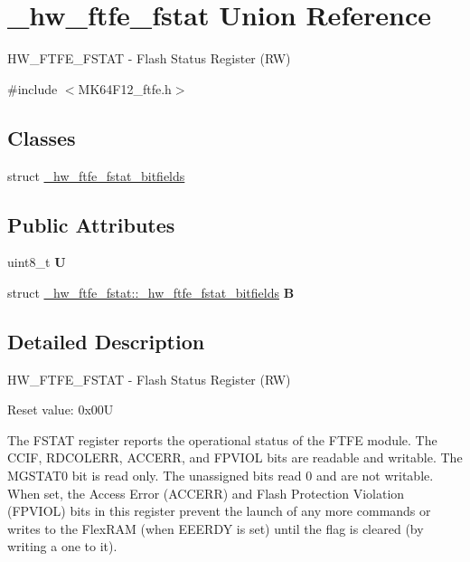\hypertarget{union__hw__ftfe__fstat}{}\section{\+\_\+hw\+\_\+ftfe\+\_\+fstat Union Reference}
\label{union__hw__ftfe__fstat}


H\+W\+\_\+\+F\+T\+F\+E\+\_\+\+F\+S\+T\+AT -\/ Flash Status Register (RW)  




{\ttfamily \#include $<$M\+K64\+F12\+\_\+ftfe.\+h$>$}

\subsection*{Classes}
\begin{DoxyCompactItemize}
\item 
struct \hyperlink{struct__hw__ftfe__fstat_1_1__hw__ftfe__fstat__bitfields}{\+\_\+hw\+\_\+ftfe\+\_\+fstat\+\_\+bitfields}
\end{DoxyCompactItemize}
\subsection*{Public Attributes}
\begin{DoxyCompactItemize}
\item 
uint8\+\_\+t {\bfseries U}\hypertarget{union__hw__ftfe__fstat_a3cd485ea4beaba5d83cbdfd9eda3754e}{}\label{union__hw__ftfe__fstat_a3cd485ea4beaba5d83cbdfd9eda3754e}

\item 
struct \hyperlink{struct__hw__ftfe__fstat_1_1__hw__ftfe__fstat__bitfields}{\+\_\+hw\+\_\+ftfe\+\_\+fstat\+::\+\_\+hw\+\_\+ftfe\+\_\+fstat\+\_\+bitfields} {\bfseries B}\hypertarget{union__hw__ftfe__fstat_afcb9180be9d4162a350b38207123f173}{}\label{union__hw__ftfe__fstat_afcb9180be9d4162a350b38207123f173}

\end{DoxyCompactItemize}


\subsection{Detailed Description}
H\+W\+\_\+\+F\+T\+F\+E\+\_\+\+F\+S\+T\+AT -\/ Flash Status Register (RW) 

Reset value\+: 0x00U

The F\+S\+T\+AT register reports the operational status of the F\+T\+FE module. The C\+C\+IF, R\+D\+C\+O\+L\+E\+RR, A\+C\+C\+E\+RR, and F\+P\+V\+I\+OL bits are readable and writable. The M\+G\+S\+T\+A\+T0 bit is read only. The unassigned bits read 0 and are not writable. When set, the Access Error (A\+C\+C\+E\+RR) and Flash Protection Violation (F\+P\+V\+I\+OL) bits in this register prevent the launch of any more commands or writes to the Flex\+R\+AM (when E\+E\+E\+R\+DY is set) until the flag is cleared (by writing a one to it). 

